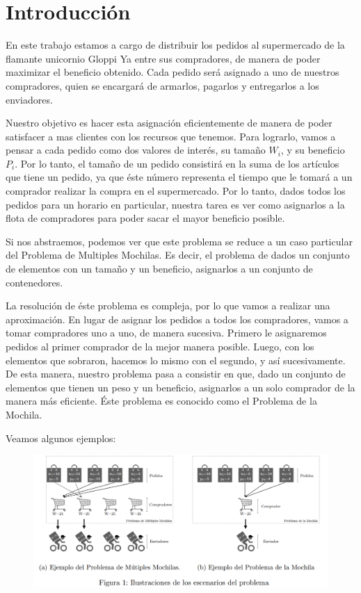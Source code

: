 \section{Introducción}
En este trabajo estamos a cargo de distribuir los pedidos al supermercado de la flamante unicornio Gloppi Ya entre sus compradores, de manera de poder maximizar el beneficio obtenido. Cada pedido será asignado a uno de nuestros compradores, quien se encargará de armarlos, pagarlos y entregarlos a los enviadores. 


Nuestro objetivo es hacer esta asignación eficientemente de manera de poder satisfacer a mas clientes con los recursos que tenemos. Para lograrlo, vamos a pensar a cada pedido como dos valores de interés, su tamaño $W_{i}$, y su beneficio $P_{i}$. Por lo tanto, el tamaño de un pedido consistirá en la suma de los artículos que tiene un pedido, ya que éste número representa el tiempo que le tomará a un comprador realizar la compra en el supermercado.
Por lo tanto, dados todos los pedidos para un horario en particular, nuestra tarea es ver como asignarlos a la flota de compradores para poder sacar el mayor beneficio posible. 


Si nos abstraemos, podemos ver que este problema se reduce a un caso particular del Problema de Multiples Mochilas. Es decir, el problema de dados un conjunto de elementos con un tamaño y un beneficio, asignarlos a un conjunto de contenedores.


La resolución de éste problema es compleja, por lo que vamos a realizar una aproximación. En lugar de asignar los pedidos a todos los compradores, vamos a tomar compradores uno a uno, de manera sucesiva. Primero le asignaremos pedidos al primer comprador de la mejor manera posible. Luego, con los elementos que sobraron, hacemos lo mismo con el segundo, y así sucesivamente.
De esta manera, nuestro problema pasa a consistir en que, dado un conjunto de elementos que tienen un peso y un beneficio, asignarlos a un solo comprador de la manera más eficiente. Éste problema es conocido como el Problema de la Mochila. 


Veamos algunos ejemplos:

\begin{figure}[H]
     \centering
     \includegraphics[width=0.5\linewidth]{img/intro}
\end{figure}


